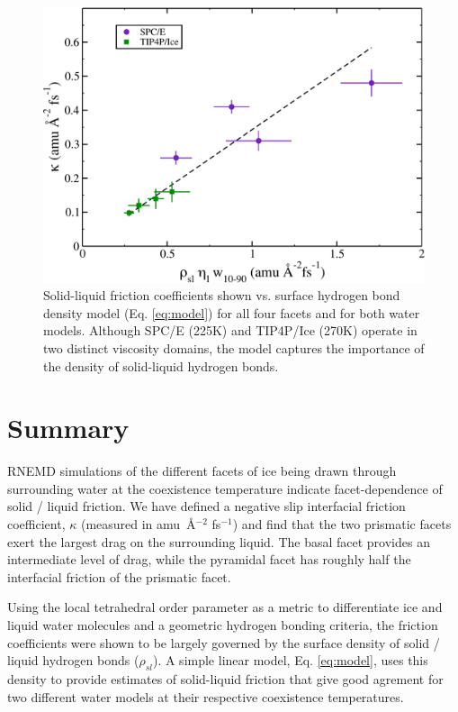\begin{figure}
\includegraphics[width=\linewidth]{Figures/simpleModel}
\caption{\label{fig:simpleModel} Solid-liquid friction coefficients
  shown vs. surface hydrogen bond density model (Eq. \eqref{eq:model})
  for all four facets and for both water models.  Although SPC/E
  (225K) and TIP4P/Ice (270K) operate in two distinct viscosity
  domains, the model captures the importance of the density of
  solid-liquid hydrogen bonds.}
\end{figure}                                            

\section{Summary}
RNEMD simulations of the different facets of ice being drawn through
surrounding water at the coexistence temperature indicate
facet-dependence of solid / liquid friction.  We have defined a
negative slip interfacial friction coefficient, $\kappa$ (measured in
amu~\AA$^{-2}$ fs$^{-1}$) and find that the two prismatic facets exert
the largest drag on the surrounding liquid.  The basal facet provides
an intermediate level of drag, while the pyramidal facet has roughly
half the interfacial friction of the prismatic facet.

Using the local tetrahedral order parameter as a metric to
differentiate ice and liquid water molecules and a geometric hydrogen
bonding criteria, the friction coefficients were shown to be largely
governed by the surface density of solid / liquid hydrogen bonds
($\rho_{sl}$).  A simple linear model, Eq. \eqref{eq:model}, uses
this density to provide estimates of solid-liquid friction that give
good agrement for two different water models at their respective
coexistence temperatures.

